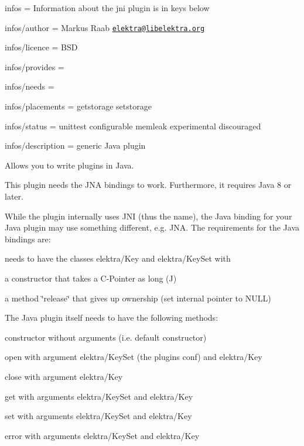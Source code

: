 
\begin{DoxyItemize}
\item infos = Information about the jni plugin is in keys below
\item infos/author = Markus Raab \href{mailto:elektra@libelektra.org}{\tt elektra@libelektra.\+org}
\item infos/licence = B\+SD
\item infos/provides =
\item infos/needs =
\item infos/placements = getstorage setstorage
\item infos/status = unittest configurable memleak experimental discouraged
\item infos/description = generic Java plugin
\end{DoxyItemize}

Allows you to write plugins in Java.

This plugin needs the J\+NA bindings to work. Furthermore, it requires Java 8 or later.

While the plugin internally uses J\+NI (thus the name), the Java binding for your Java plugin may use something different, e.\+g. J\+NA. The requirements for the Java bindings are\+:


\begin{DoxyItemize}
\item needs to have the classes {\ttfamily elektra/\+Key} and {\ttfamily elektra/\+Key\+Set} with
\begin{DoxyItemize}
\item a constructor that takes a C-\/\+Pointer as long (J)
\item a method \char`\"{}release\char`\"{} that gives up ownership (set internal pointer to N\+U\+LL)
\end{DoxyItemize}
\end{DoxyItemize}

The Java plugin itself needs to have the following methods\+:


\begin{DoxyItemize}
\item constructor without arguments (i.\+e. default constructor)
\item open with argument {\ttfamily elektra/\+Key\+Set} (the plugin\textquotesingle{}s conf) and {\ttfamily elektra/\+Key}
\item close with argument {\ttfamily elektra/\+Key}
\item get with arguments {\ttfamily elektra/\+Key\+Set} and {\ttfamily elektra/\+Key}
\item set with arguments {\ttfamily elektra/\+Key\+Set} and {\ttfamily elektra/\+Key}
\item error with arguments {\ttfamily elektra/\+Key\+Set} and {\ttfamily elektra/\+Key}
\end{DoxyItemize}

